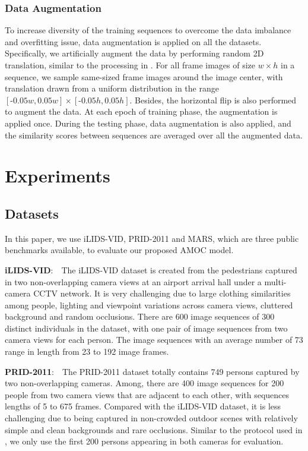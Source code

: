 \documentclass[journal]{IEEEtran}
\begin{document}
\subsubsection{Data Augmentation}
To increase diversity of the training sequences to overcome the data imbalance and overfitting issue, data augmentation is applied on all the datasets. Specifically, we artificially augment the data by performing random 2D translation, similar to the processing in \cite{mclaughlinrecurrent}. For all frame images of size $w \times h$ in a sequence, we sample same-sized frame images around the image center, with translation drawn from a uniform distribution in the range $[\text{-0.05}w, \text{0.05}w] \times [\text{-0.05}h, \text{0.05}h]$. Besides, the horizontal flip is also performed to augment the data. At each epoch of training phase, the augmentation is applied once. During the testing phase, data augmentation is also applied, and the similarity scores between sequences are averaged over all the augmented data.
\section{Experiments}
\subsection{Datasets }
 In this paper, we use iLIDS-VID\cite{wang2014person}, PRID-2011\cite{hirzer2011person} and MARS\cite{zhu2016video}, which are three public benchmarks available, to evaluate our proposed AMOC model. 
 
 \noindent\textbf{iLIDS-VID}:$\quad$The iLIDS-VID dataset is created from the pedestrians captured in two non-overlapping camera views at an airport arrival hall under a multi-camera CCTV network. It is very challenging due to large clothing similarities among people, lighting and viewpoint variations across camera views, cluttered background and random occlusions. There are 600 image sequences of 300 distinct individuals in the dataset, with one pair of image sequences from two camera views for each person. The image sequences with an average number of 73 range in length from 23 to 192 image frames. 
 
 \noindent\textbf{PRID-2011}:$\quad$The PRID-2011 dataset  totally contains 749 persons captured by two non-overlapping cameras. Among,  there are 400 image sequences for 200 people from two camera views that are adjacent to each other, with sequences lengths of 5 to 675 frames. Compared with the iLIDS-VID dataset, it is less challenging due to being captured in non-crowded outdoor scenes with relatively simple and clean backgrounds and rare occlusions. Similar to the protocol used in \cite{mclaughlinrecurrent}, we only use the first 200 persons appearing in both cameras for evaluation.
 
\end{document}
